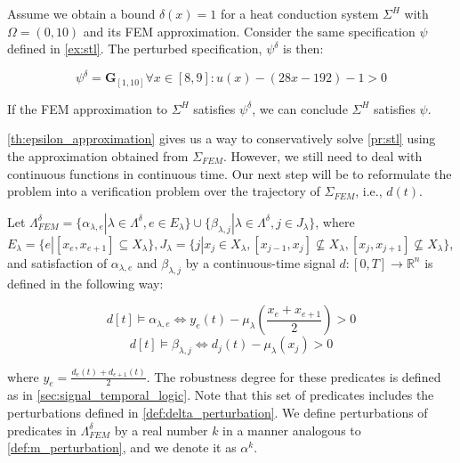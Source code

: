 \documentclass[oribibl]{llncs/llncs}
\newcommand*{\R}{\mathbb{R}}
\newcommand{\Always}{\mathbf{G}}
\begin{document}
\begin{example}
    \label{ex:eps_approx}

    Assume we obtain a bound $\delta(x) = 1$ for a heat conduction system
    $\Sigma^H$ with $\Omega = (0, 10)$ and its
    FEM approximation. Consider the same specification $\psi$ defined in \cref{ex:stl}.
    The perturbed specification, $\psi^\delta$ is then:
    
    \begin{equation}
        \psi^\delta = \Always_{[1,10]} \forall x \in [8,9] : u(x) - (28x -
        192) - 1 > 0
    \end{equation}

    If the FEM approximation to $\Sigma^H$ satisfies $\psi^\delta$, we can
    conclude $\Sigma^H$ satisfies $\psi$.
    
\end{example}

\cref{th:epsilon_approximation} gives us a way to conservatively solve
\cref{pr:stl} using the approximation obtained from $\Sigma_{FEM}$.
However, we still need to deal with continuous functions in continuous time. Our
next step will be to reformulate the problem into a verification problem over
the trajectory of $\Sigma_{FEM}$, i.e., $d(t)$.

Let $\Lambda^{\delta}_{FEM} = \{\alpha_{\lambda, e} | \lambda \in
\Lambda^{\delta}, e \in E_{\lambda}\} \cup \{\beta_{\lambda, j} | \lambda \in
\Lambda^{\delta}, j \in J_{\lambda}\}$, where $E_{\lambda} = \{e | [x_e, x_{e+1}] \subseteq
X_{\lambda}\}, J_{\lambda} = \{j | x_j \in X_\lambda, [x_{j-1}, x_j] \not\subseteq
X_\lambda, [x_{j}, x_{j+1}] \not\subseteq X_\lambda \}$,
and satisfaction of $\alpha_{\lambda, e}$ and $\beta_{\lambda, j}$ by 
a continuous-time signal $d : [0, T] \to \R^n$
is defined in the following way:

\begin{equation}
    d[t] \models \alpha_{\lambda, e} \iff y_e(t) - 
    \mu_\lambda(\frac{x_e + x_{e + 1}}{2}) > 0 
\end{equation}
\begin{equation}
     d[t] \models \beta_{\lambda, j} \iff d_j(t) - \mu_\lambda(x_j) > 0
\end{equation}

where $y_e = \frac{d_e(t) + d_{e+1}(t)}{2}$. The robustness degree for these
predicates is defined as in \cref{sec:signal_temporal_logic}.
Note that this set of predicates includes the perturbations defined in
\cref{def:delta_perturbation}. We define perturbations of predicates in
$\Lambda^{\delta}_{FEM}$ by a real number $k$ in a manner analogous to
\cref{def:m_perturbation}, and we denote it as $\alpha^k$.
\end{document}
